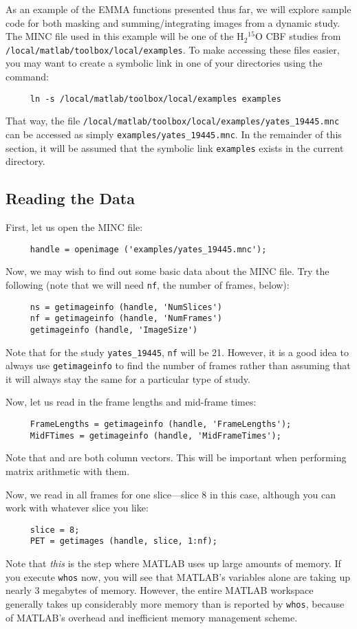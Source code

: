 As an example of the EMMA functions presented thus far, we will
explore sample code for both masking and summing/integrating images
from a dynamic study.  The MINC file used in this example will be one
of the H$_2$$^{15}$O CBF studies from
\verb|/local/matlab/toolbox/local/examples|.  To make accessing these
files easier, you may want to create a symbolic link in one of your
directories using the command:
\begin{verbatim}
     ln -s /local/matlab/toolbox/local/examples examples
\end{verbatim}
That way, the file
\verb|/local/matlab/toolbox/local/examples/yates_19445.mnc| can be
accessed as simply \verb|examples/yates_19445.mnc|.  In the remainder
of this section, it will be assumed that the symbolic link
\verb|examples| exists in the current directory.

\subsection{Reading the Data}

First, let us open the MINC file:
\begin{verbatim}
     handle = openimage ('examples/yates_19445.mnc');
\end{verbatim}
Now, we may wish to find out some basic data about the MINC file.  Try
the following (note that we will need \verb|nf|, the number of frames,
below):
\begin{verbatim}
     ns = getimageinfo (handle, 'NumSlices')
     nf = getimageinfo (handle, 'NumFrames')
     getimageinfo (handle, 'ImageSize')
\end{verbatim}
Note that for the study \verb|yates_19445|, \verb|nf| will be 21.
However, it is a good idea to always use \verb|getimageinfo| to find
the number of frames rather than assuming that it will always stay the
same for a particular type of study.

Now, let us read in the frame lengths and mid-frame times:
\begin{verbatim}
     FrameLengths = getimageinfo (handle, 'FrameLengths');
     MidFTimes = getimageinfo (handle, 'MidFrameTimes');
\end{verbatim}
Note that  and  are both column
vectors.  This will be important when performing matrix arithmetic
with them.

Now, we read in all frames for one slice---slice 8 in this case,
although you can work with whatever slice you like:
\begin{verbatim}
     slice = 8;
     PET = getimages (handle, slice, 1:nf);
\end{verbatim}
Note that {\em this} is the step where MATLAB uses up large amounts
of memory.  If you execute \verb|whos| now, you will see that
MATLAB's variables alone are taking up nearly 3 megabytes of memory.
However, the entire MATLAB workspace generally takes up considerably
more memory than is reported by \verb|whos|, because of MATLAB's
overhead and inefficient memory management scheme.

